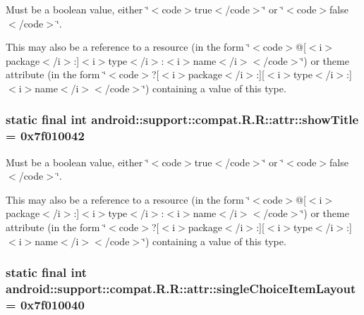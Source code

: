 Must be a boolean value, either \char`\"{}$<$code$>$true$<$/code$>$\char`\"{} or \char`\"{}$<$code$>$false$<$/code$>$\char`\"{}. 

This may also be a reference to a resource (in the form \char`\"{}$<$code$>$@\mbox{[}$<$i$>$package$<$/i$>$:\mbox{]}$<$i$>$type$<$/i$>$:$<$i$>$name$<$/i$>$$<$/code$>$\char`\"{}) or theme attribute (in the form \char`\"{}$<$code$>$?\mbox{[}$<$i$>$package$<$/i$>$:\mbox{]}\mbox{[}$<$i$>$type$<$/i$>$:\mbox{]}$<$i$>$name$<$/i$>$$<$/code$>$\char`\"{}) containing a value of this type. \hypertarget{classandroid_1_1support_1_1compat_1_1_r_1_1attr_f2271c31e83d28bb55c0ea564d48cc88}{
\subsubsection[{showTitle}]{\setlength{\rightskip}{0pt plus 5cm}static final int android::support::compat.R.R::attr::showTitle = 0x7f010042}}
\label{classandroid_1_1support_1_1compat_1_1_r_1_1attr_f2271c31e83d28bb55c0ea564d48cc88}


Must be a boolean value, either \char`\"{}$<$code$>$true$<$/code$>$\char`\"{} or \char`\"{}$<$code$>$false$<$/code$>$\char`\"{}. 

This may also be a reference to a resource (in the form \char`\"{}$<$code$>$@\mbox{[}$<$i$>$package$<$/i$>$:\mbox{]}$<$i$>$type$<$/i$>$:$<$i$>$name$<$/i$>$$<$/code$>$\char`\"{}) or theme attribute (in the form \char`\"{}$<$code$>$?\mbox{[}$<$i$>$package$<$/i$>$:\mbox{]}\mbox{[}$<$i$>$type$<$/i$>$:\mbox{]}$<$i$>$name$<$/i$>$$<$/code$>$\char`\"{}) containing a value of this type. \hypertarget{classandroid_1_1support_1_1compat_1_1_r_1_1attr_da2dcae7b93d7fb4ef37a22d4833f6a4}{
\subsubsection[{singleChoiceItemLayout}]{\setlength{\rightskip}{0pt plus 5cm}static final int android::support::compat.R.R::attr::singleChoiceItemLayout = 0x7f010040}}
\label{classandroid_1_1support_1_1compat_1_1_r_1_1attr_da2dcae7b93d7fb4ef37a22d4833f6a4}


